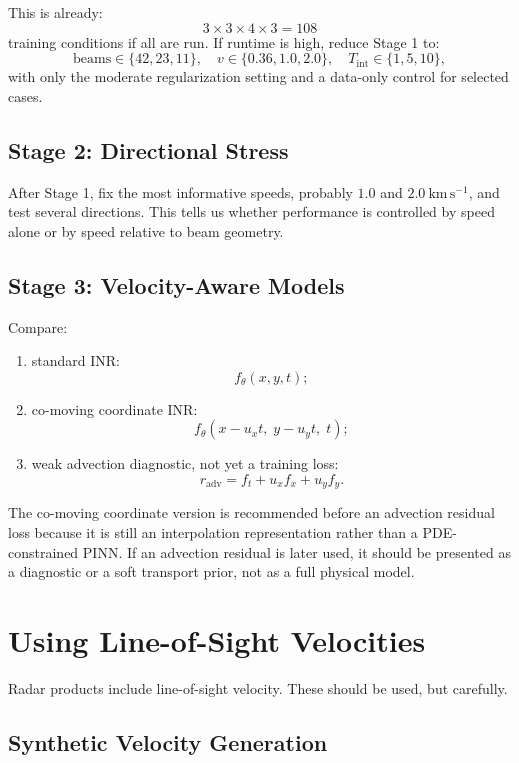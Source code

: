 \documentclass[11pt]{article}
\newcommand{\kmps}{\mathrm{km\,s^{-1}}}
\begin{document}
This is already:
\[
  3 \times 3 \times 4 \times 3 = 108
\]
training conditions if all are run. If runtime is high, reduce Stage 1 to:
\[
  \mathrm{beams}\in\{42,23,11\},\quad
  v\in\{0.36,1.0,2.0\},\quad
  T_{\mathrm{int}}\in\{1,5,10\},
\]
with only the moderate regularization setting and a data-only control for selected cases.

\subsection{Stage 2: Directional Stress}

After Stage 1, fix the most informative speeds, probably $1.0$ and $2.0~\kmps$, and test
several directions. This tells us whether performance is controlled by speed alone or by
speed relative to beam geometry.

\subsection{Stage 3: Velocity-Aware Models}

Compare:
\begin{enumerate}[leftmargin=*]
  \item standard INR:
  \[
    f_{\theta}(x,y,t);
  \]
  \item co-moving coordinate INR:
  \[
    f_{\theta}(x-u_x t,\; y-u_y t,\; t);
  \]
  \item weak advection diagnostic, not yet a training loss:
  \[
    r_{\mathrm{adv}} = f_t + u_x f_x + u_y f_y.
  \]
\end{enumerate}

The co-moving coordinate version is recommended before an advection residual loss because it is
still an interpolation representation rather than a PDE-constrained PINN. If an advection residual
is later used, it should be presented as a diagnostic or a soft transport prior, not as a full
physical model.

\section{Using Line-of-Sight Velocities}

Radar products include line-of-sight velocity. These should be used, but carefully.

\subsection{Synthetic Velocity Generation}
\end{document}
